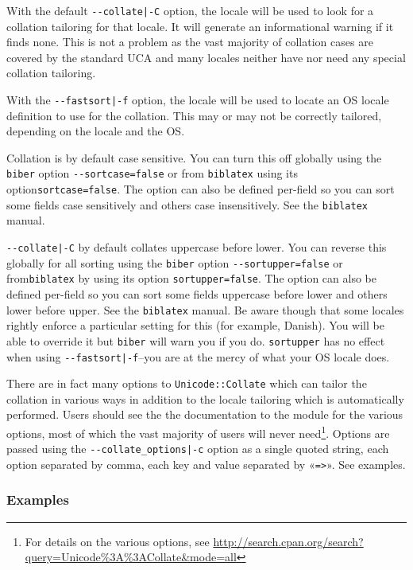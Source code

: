 \documentclass{ltxdockit}
\begin{document}
\noindent With the default \verb+--collate|-C+ option, the locale will
be used to look for a collation tailoring for that locale. It will generate an
informational warning if it finds none. This is not a problem as the vast
majority of collation cases are covered by the standard UCA and many
locales neither have nor need any special collation tailoring.

With the \verb+--fastsort|-f+ option, the locale will be
used to locate an OS locale definition to use for the collation. This
may or may not be correctly tailored, depending on the locale and the OS.

Collation is by default case sensitive. You can turn this
off globally using the \verb+biber+ option \verb+--sortcase=false+ or from
\verb+biblatex+ using its option\linebreak[4]\verb+sortcase=false+. The option can also
be defined per-field so you can sort some fields case sensitively and
others case insensitively. See the \verb+biblatex+ manual.

\verb+--collate|-C+ by default collates uppercase before lower.
You can reverse this globally for all sorting using the \verb+biber+ option
\verb+--sortupper=false+ or from\linebreak[4]\verb+biblatex+ by using its option
\verb+sortupper=false+. The option can also be defined per-field so you can
sort some fields uppercase before lower and others lower before upper. See the
\verb+biblatex+ manual. Be aware though that some locales rightly enforce a
particular setting for this (for example, Danish). You will be able to
override it but \verb+biber+ will warn you if you do. \verb+sortupper+ has
no effect when using \verb+--fastsort|-f+--you are at the mercy of what
your OS locale does.

There are in fact many options to \verb+Unicode::Collate+
which can tailor the collation in various ways in
addition to the locale tailoring which is automatically performed.
Users should see the the documentation to the module for the various
options, most of which the vast majority of users will never
need\footnote{For details on the various options, see
  \url{http://search.cpan.org/search?query=Unicode\%3A\%3ACollate&mode=all}}.
Options are passed using the \verb+--collate_options|-c+ option as a
single quoted string, each option separated by comma, each key and
value separated by «\verb+=>+». See examples.

\subsubsection{Examples}
\end{document}

